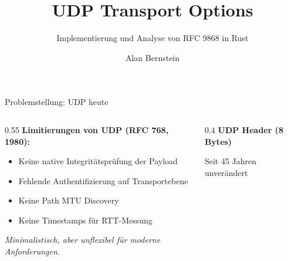 \documentclass[aspectratio=169]{beamer}
\title{UDP Transport Options}
\subtitle{Implementierung und Analyse von RFC 9868 in Rust}
\author{Alan Bernstein}
\date{}
\institute{FernUniversität in Hagen}
\begin{document}
\begin{frame}
\titlepage
\end{frame}

\begin{frame}{Problemstellung: UDP heute}
\begin{columns}[T]
\begin{column}{0.55\textwidth}
\textbf{Limitierungen von UDP (RFC 768, 1980):}
\begin{itemize}
    \item Keine native Integritätsprüfung der Payload
    \item Fehlende Authentifizierung auf Transportebene
    \item Keine Path MTU Discovery
    \item Keine Timestamps für RTT-Messung
\end{itemize}

\vspace{1em}
\textit{Minimalistisch, aber unflexibel für moderne Anforderungen.}
\end{column}
\begin{column}{0.4\textwidth}
\centering
\textbf{UDP Header (8 Bytes)}

\vspace{0.5em}

\vspace{0.5em}
{\footnotesize Seit 45 Jahren unverändert}
\end{column}
\end{columns}
\end{frame}
\end{document}

